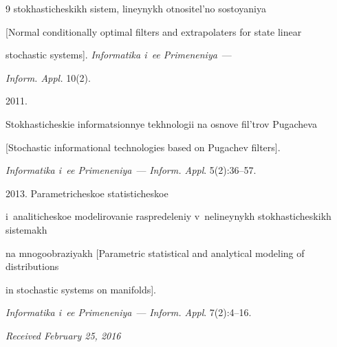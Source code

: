 {{\begin{thebibliography}{9}
stokhasticheskikh sistem,  lineynykh otnositel'no sostoyaniya 


[Normal conditionally optimal filters and extrapolaters for state linear 


stochastic systems]. \textit{Informatika i~ee Primeneniya}~---


\textit{Inform. Appl.} 10(2).













 2011. 


Stokhasticheskie informatsionnye tekhnologii na osnove fil'trov Pugacheva 


[Stochastic informational technologies based on Pugachev filters].


\textit{Informatika i~ee Primeneniya}~--- \textit{Inform. Appl}. 5(2):36--57.







 2013. Parametricheskoe statisticheskoe 


i~analiticheskoe modelirovanie raspredeleniy v~nelineynykh stokhasticheskikh sistemakh 


na mnogoobraziyakh [Parametric statistical and analytical modeling of distributions 


in stochastic systems on manifolds]. 


\textit{Informatika i~ee Primeneniya}~--- \textit{Inform. Appl}. 7(2):4--16.


\end{thebibliography}


} }








\vspace*{-4pt}





\hfill{\small\textit{Received February 25, 2016}}





\Contr





\noindent


